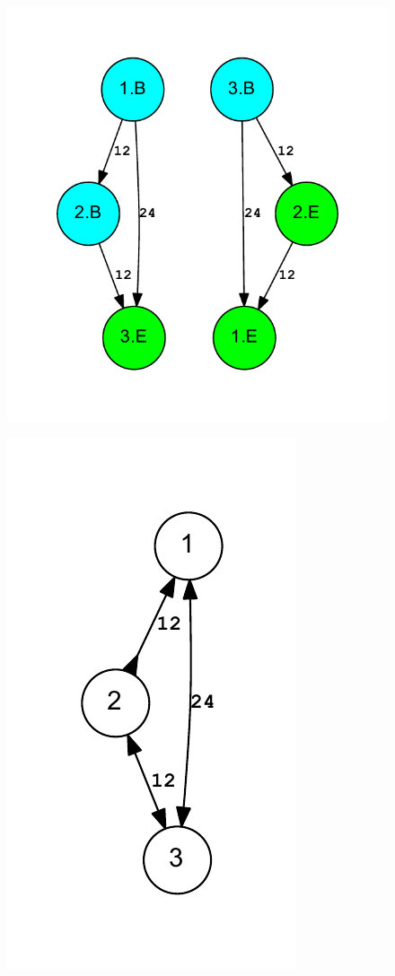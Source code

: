 \documentclass[letterpaper,12pt]{article}
\begin{document}
\begin{figure}
\includegraphics{out.digraph.pdf}
\end{figure}

\begin{figure}
\includegraphics{out.bidigraph.pdf}
\end{figure}
\end{document}
